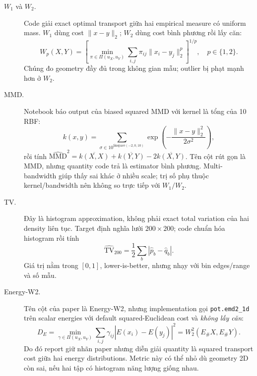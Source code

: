 \documentclass[11pt,a4paper]{article}
\newcommand{\code}[1]{\texttt{#1}}
\begin{document}
\begin{description}
  \item[$W_1$ và $W_2$.] Code giải exact optimal transport giữa hai empirical measure có uniform mass. $W_1$ dùng cost $\lVert x-y\rVert_2$; $W_2$ dùng cost bình phương rồi lấy căn:
  \begin{equation}
    W_p(X,Y)=\left[\min_{\pi\in\Pi(u_X,u_Y)}
    \sum_{i,j}\pi_{ij}\lVert x_i-y_j\rVert_2^p\right]^{1/p},\quad p\in\{1,2\}.
  \end{equation}
  Chúng đo geometry đầy đủ trong không gian mẫu; outlier bị phạt mạnh hơn ở $W_2$.

  \item[MMD.] Notebook báo output của biased squared MMD với kernel là tổng của 10 RBF:
  \begin{equation}
    k(x,y)=\sum_{\sigma\in 10^{\mathrm{linspace}(-2,0,10)}}
    \exp\!\left(-\frac{\lVert x-y\rVert_2^2}{2\sigma^2}\right),
  \end{equation}
  rồi tính $\widehat{\mathrm{MMD}}^2=\overline{k(X,X)}+\overline{k(Y,Y)}-2\overline{k(X,Y)}$. Tên cột rút gọn là MMD, nhưng quantity code trả là estimator bình phương. Multi-bandwidth giúp thấy sai khác ở nhiều scale; trị số phụ thuộc kernel/bandwidth nên không so trực tiếp với $W_1/W_2$.

  \item[TV.] Đây là histogram approximation, không phải exact total variation của hai density liên tục. Target định nghĩa lưới $200\times200$; code chuẩn hóa histogram rồi tính
  \begin{equation}
    \widehat{\mathrm{TV}}_{200}=\frac{1}{2}\sum_b|\hat p_b-\hat q_b|.
  \end{equation}
  Giá trị nằm trong $[0,1]$, lower-is-better, nhưng nhạy với bin edges/range và số mẫu.

  \item[Energy-W2.] Tên cột của paper là Energy-W2, nhưng implementation gọi \code{pot.emd2\_1d} trên scalar energies với default squared-Euclidean cost và \emph{không lấy căn}:
  \begin{equation}
    D_{E}=\min_{\gamma\in\Pi(u_X,u_Y)}
    \sum_{i,j}\gamma_{ij}|E(x_i)-E(y_j)|^2=W_2^2(E_\#X,E_\#Y).
  \end{equation}
  Do đó report giữ nhãn paper nhưng diễn giải quantity là squared transport cost giữa hai energy distributions. Metric này có thể nhỏ dù geometry 2D còn sai, nếu hai tập có histogram năng lượng giống nhau.
\end{description}
\end{document}
